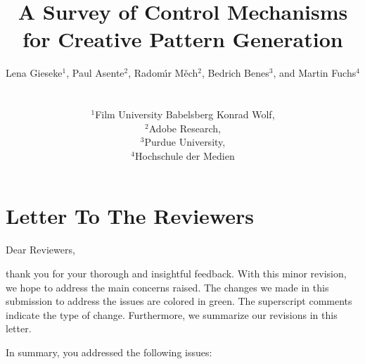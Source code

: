 \documentclass{egpubl}
\title[A Survey of Control Mechanisms for Creative Pattern Generation]%
      {A Survey of Control Mechanisms for Creative Pattern Generation}
\author[L. Gieseke, P. Asente, R. Mech, B. Benes, M. Fuchs]
{\parbox{\textwidth}{\centering Lena Gieseke$^{1}$, Paul Asente$^{2}$, Radom\'{\i}r M\v{e}ch$^{2}$, Bedrich Benes$^{3}$, and Martin Fuchs$^{4}$}
        \\
{\parbox{\textwidth}{\centering $^1$Film University Babelsberg Konrad Wolf,\\
         $^2$Adobe Research,\\
         $^3$Purdue University,\\
         $^4$Hochschule der Medien
       }
}
}
\begin{document}
\onecolumn %



\maketitle




\section*{Letter To The Reviewers}

Dear Reviewers,


thank you for your thorough and insightful feedback. With this minor revision, we hope to address the main concerns raised. The changes we made in this submission to address the issues are colored in green. The superscript comments indicate the type of change. Furthermore, we summarize our revisions in this letter.

In summary, you addressed the following issues:


\end{document}
